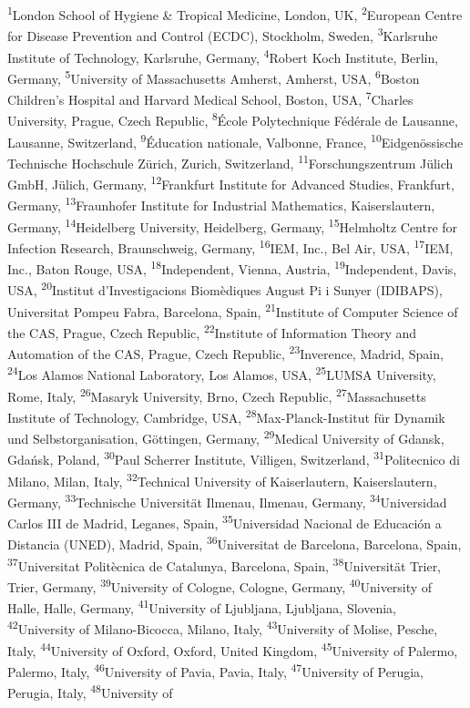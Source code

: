 \documentclass[
]{article}
\begin{document}
\textsuperscript{1}London School of Hygiene \& Tropical Medicine, London, UK, \textsuperscript{2}European Centre for Disease Prevention and Control (ECDC), Stockholm, Sweden, \textsuperscript{3}Karlsruhe Institute of Technology, Karlsruhe, Germany, \textsuperscript{4}Robert Koch Institute, Berlin, Germany, \textsuperscript{5}University of Massachusetts Amherst, Amherst, USA, \textsuperscript{6}Boston Children's Hospital and Harvard Medical School, Boston, USA, \textsuperscript{7}Charles University, Prague, Czech Republic, \textsuperscript{8}École Polytechnique Fédérale de Lausanne, Lausanne, Switzerland, \textsuperscript{9}Éducation nationale, Valbonne, France, \textsuperscript{10}Eidgenössische Technische Hochschule Zürich, Zurich, Switzerland, \textsuperscript{11}Forschungszentrum Jülich GmbH, Jülich, Germany, \textsuperscript{12}Frankfurt Institute for Advanced Studies, Frankfurt, Germany, \textsuperscript{13}Fraunhofer Institute for Industrial Mathematics, Kaiserslautern, Germany, \textsuperscript{14}Heidelberg University, Heidelberg, Germany, \textsuperscript{15}Helmholtz Centre for Infection Research, Braunschweig, Germany, \textsuperscript{16}IEM, Inc., Bel Air, USA, \textsuperscript{17}IEM, Inc., Baton Rouge, USA, \textsuperscript{18}Independent, Vienna, Austria, \textsuperscript{19}Independent, Davis, USA, \textsuperscript{20}Institut d'Investigacions Biomèdiques August Pi i Sunyer (IDIBAPS), Universitat Pompeu Fabra, Barcelona, Spain, \textsuperscript{21}Institute of Computer Science of the CAS, Prague, Czech Republic, \textsuperscript{22}Institute of Information Theory and Automation of the CAS, Prague, Czech Republic, \textsuperscript{23}Inverence, Madrid, Spain, \textsuperscript{24}Los Alamos National Laboratory, Los Alamos, USA, \textsuperscript{25}LUMSA University, Rome, Italy, \textsuperscript{26}Masaryk University, Brno, Czech Republic, \textsuperscript{27}Massachusetts Institute of Technology, Cambridge, USA, \textsuperscript{28}Max-Planck-Institut für Dynamik und Selbstorganisation, Göttingen, Germany, \textsuperscript{29}Medical University of Gdansk, Gdańsk, Poland, \textsuperscript{30}Paul Scherrer Institute, Villigen, Switzerland, \textsuperscript{31}Politecnico di Milano, Milan, Italy, \textsuperscript{32}Technical University of Kaiserlautern, Kaiserslautern, Germany, \textsuperscript{33}Technische Universität Ilmenau, Ilmenau, Germany, \textsuperscript{34}Universidad Carlos III de Madrid, Leganes, Spain, \textsuperscript{35}Universidad Nacional de Educación a Distancia (UNED), Madrid, Spain, \textsuperscript{36}Universitat de Barcelona, Barcelona, Spain, \textsuperscript{37}Universitat Politècnica de Catalunya, Barcelona, Spain, \textsuperscript{38}Universität Trier, Trier, Germany, \textsuperscript{39}University of Cologne, Cologne, Germany, \textsuperscript{40}University of Halle, Halle, Germany, \textsuperscript{41}University of Ljubljana, Ljubljana, Slovenia, \textsuperscript{42}University of Milano-Bicocca, Milano, Italy, \textsuperscript{43}University of Molise, Pesche, Italy, \textsuperscript{44}University of Oxford, Oxford, United Kingdom, \textsuperscript{45}University of Palermo, Palermo, Italy, \textsuperscript{46}University of Pavia, Pavia, Italy, \textsuperscript{47}University of Perugia, Perugia, Italy, \textsuperscript{48}University of 
\end{document}
